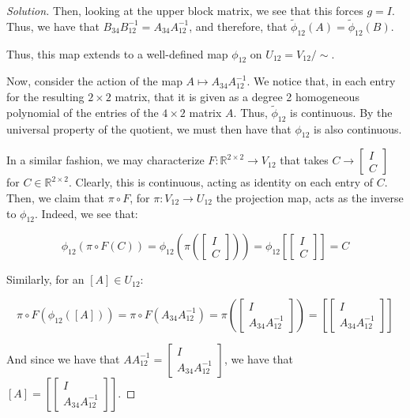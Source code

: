 \documentclass[10pt]{article}
\begin{document}
\begin{proof}[Solution]
Then, looking at the upper block matrix, we see that this forces $g = I$. Thus, we have that $ B_{34}B^{-1}_{12} =  A _{34}A^{-1}_{12}$, and therefore, that $\tilde{\phi}_{12}(A) = \tilde{\phi}_{12}(B)$.

Thus, this map extends to a well-defined map $\phi_{12}$ on $U_{12} = V_{12}/ \sim$.

Now, consider the action of the map $A \mapsto A_{34}A^{-1}_{12}$. We notice that, in each entry for the resulting $2 \times 2$ matrix, that it is given as a degree 2 homogeneous polynomial of the entries of the $4 \times 2$ matrix $A$. Thus, $\tilde{\phi}_{12}$ is continuous. By the universal property of the quotient, we must then have that $\phi_{12}$ is also continuous. 

In a similar fashion, we may characterize $F: \mathbb{R}^{2 \times 2} \to V_{12}$ that takes $C \to \begin{bmatrix} I \\ C \end{bmatrix}$ for $C \in \mathbb{R}^{2 \times 2}$. Clearly, this is continuous, acting as identity on each entry of $C$. Then, we claim that $\pi \circ F$, for $\pi: V_{12} \to U_{12}$ the projection map, acts as the inverse to $\phi_{12}$. Indeed, we see that:

$$ \phi_{12}(\pi \circ F(C)) = \phi_{12}(\pi( \begin{bmatrix} I \\ C \end{bmatrix})) = \phi_{12}[\begin{bmatrix} I \\ C \end{bmatrix}] = C$$

Similarly, for an $[A] \in U_{12}$:

$$ \pi \circ F(\phi_{12}([A]))  =  \pi \circ F( A _{34}A^{-1}_{12}) = \pi( \begin{bmatrix} I \\ A _{34}A^{-1}_{12} \end{bmatrix})  = [\begin{bmatrix} I \\ A _{34}A^{-1}_{12} \end{bmatrix}]$$

And since we have that $AA^{-1}_{12} =  \begin{bmatrix} I \\ A _{34}A^{-1}_{12} \end{bmatrix}$, we have that $[A] = [\begin{bmatrix} I \\ A _{34}A^{-1}_{12} \end{bmatrix}]$. 


\end{proof}
\end{document}
